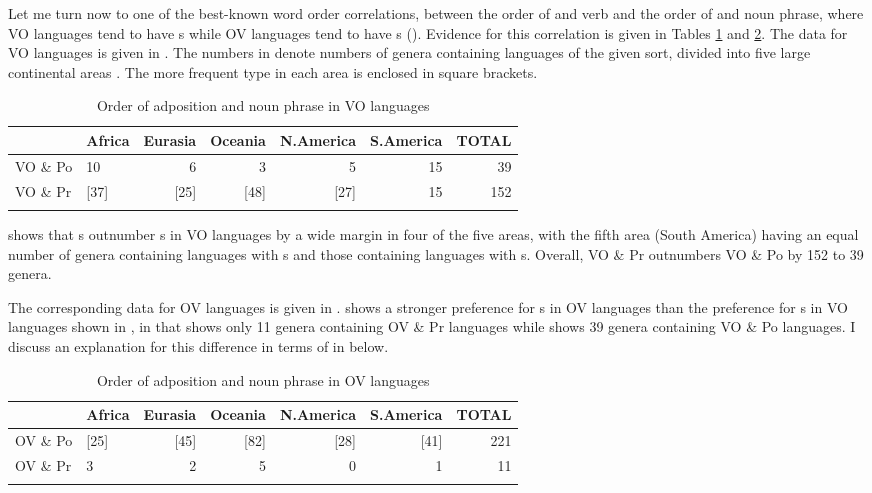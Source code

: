 \documentclass[output=paper]{langsci/langscibook}
\begin{document}
Let me turn now to one of the best-known word order correlations, between the order of  and verb and the order of  and noun phrase, where VO languages tend to have s while OV languages tend to have s (\citealt{Greenberg1963,Dryer1992}). Evidence for this correlation is given in Tables \ref{tab:dryer:1} and \ref{tab:dryer:2}. The data for VO languages is given in . The numbers in  denote numbers of genera containing languages of the given sort, divided into five large continental areas \citep{Dryer1989}. The more frequent type in each area is enclosed in square brackets.

\begin{table}
\begin{tabularx}{\textwidth}{Xlrrrrr} 
\lsptoprule
& \bfseries Africa & \bfseries Eurasia & \bfseries Oceania & \bfseries N.America & \bfseries S.America & \bfseries TOTAL\\
\midrule
VO \& Po & 10 & 6 & 3 & 5 & 15 & 39\\
VO \& Pr & [37] & [25] & [48] & [27] & 15 & 152\\
\lspbottomrule
\end{tabularx}
\caption{\label{tab:dryer:1}Order of adposition and noun phrase in VO languages}
\end{table}



 shows that s outnumber s in VO languages by a wide margin in four of the five areas, with the fifth area (South America) having an equal number of genera containing languages with s and those containing languages with s. Overall, VO \& Pr outnumbers VO \& Po by 152 to 39 genera.

The corresponding data for OV languages is given in .
 shows a stronger preference for s in OV languages than the preference for s in VO languages shown in , in that  shows only 11 genera containing OV \& Pr languages while  shows 39 genera containing VO \& Po languages. I discuss an explanation for this difference in terms of  in  below.

\begin{table}
\begin{tabularx}{\textwidth}{Xlrrrrr} 
\lsptoprule
& \bfseries Africa & \bfseries Eurasia & \bfseries Oceania & \bfseries N.America & \bfseries S.America & \bfseries TOTAL\\
\midrule
OV \& Po & [25] & [45] & [82] & [28] & [41] & 221\\
OV \& Pr & 3 & 2 & 5 & 0 & 1 & 11\\
\lspbottomrule
\end{tabularx}
\caption{\label{tab:dryer:2}Order of adposition and noun phrase in OV languages}
\end{table}
\end{document}
